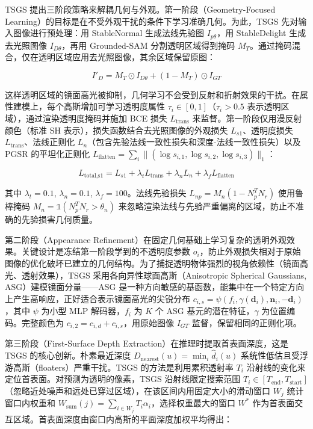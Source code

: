TSGS 提出三阶段策略来解耦几何与外观。第一阶段（Geometry-Focused Learning）的目标是在不受外观干扰的条件下学习准确几何。为此，TSGS 先对输入图像进行预处理：用 StableNormal 生成法线先验图 $I_{p\theta}$，用 StableDelight 生成去光照图像 $I_{D\theta}$，再用 Grounded-SAM 分割透明区域得到掩码 $M_T$。通过掩码混合，仅在透明区域应用去光照图像，其余区域保留原图：

\begin{equation}
I'_D = M_T \odot I_{D\theta} + (1 - M_T) \odot I_{GT}
\end{equation}

这样透明区域的镜面高光被抑制，几何学习不会受到反射和折射效果的干扰。在属性建模上，每个高斯增加可学习透明度属性 $\tau_i \in [0,1]$（$\tau_i > 0.5$ 表示透明区域），通过渲染透明度掩码并施加 BCE 损失 $L_{\text{trans}}$ 来监督。第一阶段仅用漫反射颜色（标准 SH 表示），损失函数结合去光照图像的外观损失 $L_{s1}$、透明度损失 $L_{\text{trans}}$、法线正则化 $L_n$（包含先验法线一致性损失和深度-法线一致性损失）以及 PGSR 的平坦化正则化 $L_{\text{flatten}} = \sum_i \|(\log s_{i,1}, \log s_{i,2}, \log s_{i,3})\|_1$：

\begin{equation}
L_{\text{total,s1}} = L_{s1} + \lambda_t L_{\text{trans}} + \lambda_n L_n + \lambda_f L_{\text{flatten}}
\end{equation}

其中 $\lambda_t=0.1$, $\lambda_n=0.1$, $\lambda_f=100$。法线先验损失 $L_{np} = M_n (1 - N_p^T N_r)$ 使用鲁棒掩码 $M_n = \mathbb{1}(N_p^T N_r > \theta_n)$ 来忽略渲染法线与先验严重偏离的区域，防止不准确的先验损害几何质量。

第二阶段（Appearance Refinement）在固定几何基础上学习复杂的透明外观效果。关键设计是冻结第一阶段学到的不透明度参数 $o_i$，防止外观损失相对于原始图像的优化破坏已建立的几何结构。为了捕捉透明物体强烈的视角依赖性（镜面高光、透射效果），TSGS 采用各向异性球面高斯（Anisotropic Spherical Gaussians, ASG）建模镜面分量——ASG 是一种方向敏感的基函数，能集中在一个特定方向上产生高响应，正好适合表示镜面高光的尖锐分布 $c_{i,s} = \psi(f_i, \gamma(\mathbf{d}_i), \mathbf{n}_i, -\mathbf{d}_i)$，其中 $\psi$ 为小型 MLP 解码器，$f_i$ 为 $K$ 个 ASG 基元的潜在特征，$\gamma$ 为位置编码。完整颜色为 $c_{i,2} = c_{i,d} + c_{i,s}$，用原始图像 $I_{GT}$ 监督，保留相同的正则化项。

第三阶段（First-Surface Depth Extraction）在推理时提取首表面深度，这是 TSGS 的核心创新。朴素最近深度 $D_{\text{nearest}}(u) = \min_i \hat{d}_i(u)$ 系统性低估且受浮游高斯（floaters）严重干扰。TSGS 的方法是利用累积透射率 $T_i$ 沿射线的变化来定位首表面。对预测为透明的像素，TSGS 沿射线限定搜索范围 $T_i \in [T_{\text{end}}, T_{\text{start}}]$（忽略近处噪声和远处已穿过区域），在该区间内用固定大小的滑动窗口 $W_j$ 统计窗口内权重和 $W_{\text{sum}}(j) = \sum_{i \in W_j} T_i \alpha_i$，选择权重最大的窗口 $W^*$ 作为首表面交互区域。首表面深度由窗口内高斯的平面深度加权平均得出：


